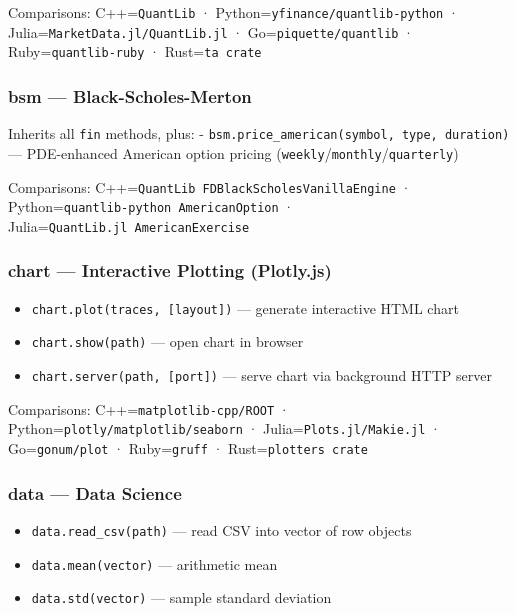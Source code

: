 \documentclass[
]{article}
\providecommand{\tightlist}{%
  \setlength{\itemsep}{0pt}\setlength{\parskip}{0pt}}
\begin{document}
Comparisons: C++=\texttt{QuantLib} ·
Python=\texttt{yfinance/quantlib-python} ·
Julia=\texttt{MarketData.jl/QuantLib.jl} · Go=\texttt{piquette/quantlib}
· Ruby=\texttt{quantlib-ruby} · Rust=\texttt{ta\ crate}

\subsubsection{bsm ---
Black-Scholes-Merton}\label{bsm-black-scholes-merton}

Inherits all \texttt{fin} methods, plus: -
\texttt{bsm.price\_american(symbol,\ type,\ duration)} --- PDE-enhanced
American option pricing
(\texttt{weekly}/\texttt{monthly}/\texttt{quarterly})

Comparisons: C++=\texttt{QuantLib\ FDBlackScholesVanillaEngine} ·
Python=\texttt{quantlib-python\ AmericanOption} ·
Julia=\texttt{QuantLib.jl\ AmericanExercise}

\subsubsection{chart --- Interactive Plotting
(Plotly.js)}\label{chart-interactive-plotting-plotly.js}

\begin{itemize}
\tightlist
\item
  \texttt{chart.plot(traces,\ {[}layout{]})} --- generate interactive
  HTML chart
\item
  \texttt{chart.show(path)} --- open chart in browser
\item
  \texttt{chart.server(path,\ {[}port{]})} --- serve chart via
  background HTTP server
\end{itemize}

Comparisons: C++=\texttt{matplotlib-cpp/ROOT} ·
Python=\texttt{plotly/matplotlib/seaborn} ·
Julia=\texttt{Plots.jl/Makie.jl} · Go=\texttt{gonum/plot} ·
Ruby=\texttt{gruff} · Rust=\texttt{plotters\ crate}

\subsubsection{data --- Data Science}\label{data-data-science}

\begin{itemize}
\tightlist
\item
  \texttt{data.read\_csv(path)} --- read CSV into vector of row objects
\item
  \texttt{data.mean(vector)} --- arithmetic mean
\item
  \texttt{data.std(vector)} --- sample standard deviation
\end{itemize}
\end{document}
